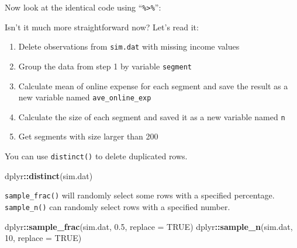\documentclass[12pt,]{krantz}
\makeatletter
\newenvironment{Shaded}{\begin{snugshade}}{\end{snugshade}}
\newcommand{\KeywordTok}[1]{\textcolor[rgb]{0.27,0.27,0.27}{\textbf{#1}}}
\newcommand{\DataTypeTok}[1]{\textcolor[rgb]{0.27,0.27,0.27}{#1}}
\newcommand{\DecValTok}[1]{\textcolor[rgb]{0.06,0.06,0.06}{#1}}
\newcommand{\FloatTok}[1]{\textcolor[rgb]{0.06,0.06,0.06}{#1}}
\newcommand{\StringTok}[1]{\textcolor[rgb]{0.5,0.5,0.5}{#1}}
\newcommand{\OtherTok}[1]{\textcolor[rgb]{0.37,0.37,0.37}{#1}}
\newcommand{\OperatorTok}[1]{\textcolor[rgb]{0.43,0.43,0.43}{\textbf{#1}}}
\newcommand{\NormalTok}[1]{#1}
\providecommand{\tightlist}{%
  \setlength{\itemsep}{0pt}\setlength{\parskip}{0pt}}
\newenvironment{kframe}{%
\medskip{}
\setlength{\fboxsep}{.8em}
 \def\at@end@of@kframe{}%
 \ifinner\ifhmode%
  \def\at@end@of@kframe{\end{minipage}}%
  \begin{minipage}{\columnwidth}%
 \fi\fi%
 \def\FrameCommand##1{\hskip\@totalleftmargin \hskip-\fboxsep
 \colorbox{shadecolor}{##1}\hskip-\fboxsep
     \hskip-\linewidth \hskip-\@totalleftmargin \hskip\columnwidth}%
 \MakeFramed {\advance\hsize-\width
   \@totalleftmargin\z@ \linewidth\hsize
   \@setminipage}}%
 {\par\unskip\endMakeFramed%
 \at@end@of@kframe}
\renewenvironment{Shaded}{\begin{kframe}}{\end{kframe}}
\theoremstyle{definition}
\theoremstyle{definition}
\theoremstyle{definition}
\theoremstyle{remark}
\makeatother
\begin{document}
Now look at the identical code using ``\texttt{\%\textgreater{}\%}'':

\begin{Shaded}
\end{Shaded}

Isn't it much more straightforward now? Let's read it:

\begin{enumerate}
\def\labelenumi{\arabic{enumi}.}
\tightlist
\item
  Delete observations from \texttt{sim.dat} with missing income values
\item
  Group the data from step 1 by variable \texttt{segment}
\item
  Calculate mean of online expense for each segment and save the result
  as a new variable named \texttt{ave\_online\_exp}
\item
  Calculate the size of each segment and saved it as a new variable
  named \texttt{n}
\item
  Get segments with size larger than 200
\end{enumerate}

You can use \texttt{distinct()} to delete duplicated rows.

\begin{Shaded}
\begin{Highlighting}[]
\NormalTok{dplyr}\OperatorTok{::}\KeywordTok{distinct}\NormalTok{(sim.dat)}
\end{Highlighting}
\end{Shaded}

\texttt{sample\_frac()} will randomly select some rows with a specified
percentage. \texttt{sample\_n()} can randomly select rows with a
specified number.

\begin{Shaded}
\begin{Highlighting}[]
\NormalTok{dplyr}\OperatorTok{::}\KeywordTok{sample_frac}\NormalTok{(sim.dat, }\FloatTok{0.5}\NormalTok{, }\DataTypeTok{replace =} \OtherTok{TRUE}\NormalTok{) }
\NormalTok{dplyr}\OperatorTok{::}\KeywordTok{sample_n}\NormalTok{(sim.dat, }\DecValTok{10}\NormalTok{, }\DataTypeTok{replace =} \OtherTok{TRUE}\NormalTok{) }
\end{Highlighting}
\end{Shaded}
\end{document}

